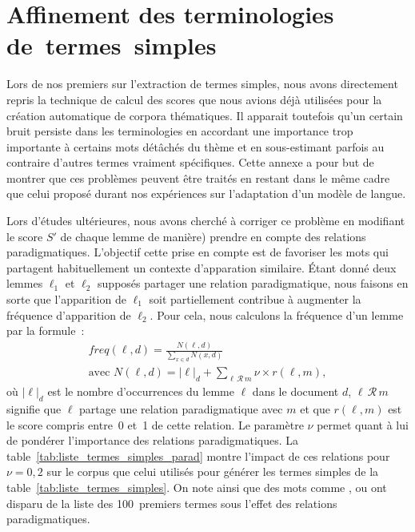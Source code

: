 \chapter{Affinement des terminologies de~termes~simples}
\label{app:rel_par}
Lors de nos premiers sur l'extraction de termes simples, nous
avons directement
repris la technique de calcul des scores \tfidf que nous avions déjà utilisées
pour la création automatique de corpora thématiques. Il apparait toutefois
qu'un certain bruit persiste dans les terminologies en accordant une importance
trop importante à certains mots détâchés du thème et en sous-estimant parfois
au contraire d'autres termes vraiment spécifiques. Cette annexe a pour but de
montrer que ces problèmes peuvent être traités en restant dans le même cadre
que celui proposé durant nos expériences sur l'adaptation d'un modèle de langue.

Lors d'études ultérieures, nous avons cherché à corriger ce problème en
modifiant le score $S'$ de chaque lemme de manière) prendre en compte des
relations paradigmatiques. L'objectif cette prise en compte est de
favoriser les mots qui partagent habituellement un contexte d'apparation
similaire. Étant donné
deux lemmes $\ell_1$ et $\ell_2$ supposés partager une relation paradigmatique,
nous faisons en sorte que l'apparition de $\ell_1$ soit partiellement contribue
à augmenter la fréquence d'apparition de $\ell_2$. Pour cela, nous
calculons la fréquence d'un lemme par la formule~:
\begin{eqnarray}
\textit{freq}(\ell,d) = \frac{N(\ell,d)}{\sum_{x \in d} N(x,d)}\\
\mbox{avec } N(\ell,d) = |\ell|_d + \sum_{\ell\,\mathcal{R}\,m} \nu
\times r(\ell,m),
\end{eqnarray}
où $|\ell|_d$ est le nombre d'occurrences du lemme $\ell$ dans le document $d$,
$\ell\,\mathcal{R}\,m$ signifie que $\ell$ partage une relation paradigmatique
avec $m$ et que $r(\ell,m)$ est le score compris entre~0 et~1 de cette
relation. Le paramètre $\nu$ permet quant à lui de pondérer l'importance des
relations paradigmatiques. La table~\ref{tab:liste_termes_simples_parad} montre
l'impact de ces relations pour $\nu = 0,2$ sur le corpus que celui utilisés pour
générer les termes simples de la table~\ref{tab:liste_termes_simples}. On note
ainsi que des mots comme ,  ou 
ont disparu de la liste des 100~premiers termes sous l'effet des relations
paradigmatiques.

